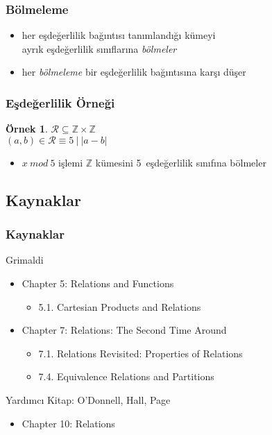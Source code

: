 \documentclass[dvipsnames]{beamer}
\theoremstyle{definition}
\theoremstyle{example}
\newtheorem{ornek}[theorem]{Örnek}
\theoremstyle{plain}
\begin{document}
\begin{frame}
  \frametitle{Bölmeleme}

  \begin{itemize}
    \item her eşdeğerlilik bağıntısı tanımlandığı kümeyi\\
      ayrık eşdeğerlilik sınıflarına \emph{bölmeler}

    \pause
    \medskip
    \item her \emph{bölmeleme} bir eşdeğerlilik bağıntısına karşı düşer
  \end{itemize}
\end{frame}

\begin{frame}
  \frametitle{Eşdeğerlilik Örneği}

  \begin{ornek}
    $\mathcal{R} \subseteq \mathbb{Z} \times \mathbb{Z}$\\
    $(a,b) \in \mathcal{R} \equiv 5~|~|a - b|$

    \pause
    \bigskip
    \begin{itemize}
      \item $x~mod~5$ işlemi $\mathbb{Z}$ kümesini 5~eşdeğerlilik sınıfına
        bölmeler
    \end{itemize}
  \end{ornek}
\end{frame}

\subsection*{Kaynaklar}

\begin{frame}
  \frametitle{Kaynaklar}

  \begin{block}{Grimaldi}
    \begin{itemize}
      \item Chapter 5: Relations and Functions
      \begin{itemize}
        \item 5.1. \alert{Cartesian Products and Relations}
      \end{itemize}
      \item Chapter 7: Relations: The Second Time Around
      \begin{itemize}
        \item 7.1. \alert{Relations Revisited: Properties of Relations}
        \item 7.4. \alert{Equivalence Relations and Partitions}
      \end{itemize}
    \end{itemize}
  \end{block}

  \begin{block}{Yardımcı Kitap: O'Donnell, Hall, Page}
    \begin{itemize}
      \item Chapter 10: Relations
    \end{itemize}
  \end{block}
\end{frame}
\end{document}
